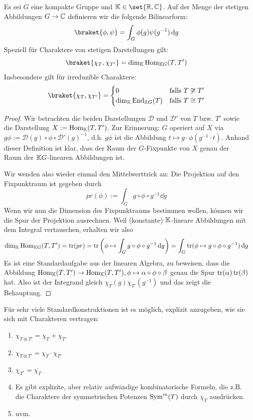\begin{theorem}[1.Orthogonalitätsrelation]
Es sei $G$ eine kompakte Gruppe und $\IK\in\set{\IR,\IC}$. Auf der Menge der stetigen Abbildungen $G\to\mathbb{C}$ definieren wir die folgende Bilinearform:
\[\braket{\phi,\psi} = \int_G \phi(g)\psi(g^{-1}) \dd g\]
Speziell für Charaktere von stetigen Darstellungen gilt:
\[\braket{\chi_T, \chi_{T'}} = \dim_\IK \Hom_{\IK G}(T,T')\]
Insbesondere gilt für irreduzible Charaktere:
\[\braket{\chi_T, \chi_{T'}} = \begin{cases} 0 & \text{falls }T\not\isomorphic T' \\ \dim_\IK \End_{\IK G}(T) & \text{falls }T\isomorphic T'\end{cases}\]
\end{theorem}
\begin{proof}
Wir betrachten die beiden Darstellungen $\mathcal{D}$ und $\mathcal{D}'$ von $T$ bzw. $T'$ sowie die Darstellung $X:=\operatorname{Hom}_{\mathbb{K}}(T,T')$. Zur Erinnerung: $G$ operiert auf $X$ via $g\phi := \mathcal{D}(g)\circ\phi\circ \mathcal{D}'(g)^{-1}$, d.h. $g\phi$ ist die Abbildung $t\mapsto g\cdot\phi(g^{-1}\cdot t)$. Anhand dieser Definition ist klar, dass der Raum der $G$-Fixpunkte von $X$ genau der Raum der $\mathbb{K} G$-linearen Abbildungen ist.

\smallbreak
Wir wenden also wieder einmal den Mittelwerttrick an: Die Projektion auf den Fixpunktraum ist gegeben durch
\[pr(\phi) := \int_G g\circ\phi\circ g^{-1} \dd g\]
Wenn wir nun die Dimension des Fixpunktraums bestimmen wollen, können wir die Spur der Projektion ausrechnen. Weil (konstante) $\mathbb{K}$-lineare Abbildungen mit dem Integral vertauschen, erhalten wir also
\[\dim_{\mathbb{K}} \operatorname{Hom}_{\mathbb{K} G}(T,T') = \operatorname{tr}(pr) = \operatorname{tr}\left(\phi \mapsto \int_G g\circ\phi\circ g^{-1} \,\textrm{d} g \right) = \int_G \operatorname{tr}(\phi \mapsto g\circ \phi\circ g^{-1}) \,\textrm{d} g\]
Es ist eine Standardaufgabe aus der linearen Algebra, zu beweisen, dass die Abbildung $\operatorname{Hom}_{\mathbb{K}}(T,T') \to \operatorname{Hom}_{\mathbb{K}}(T,T'), \phi \mapsto \alpha\circ\phi\circ\beta$ genau die Spur $\operatorname{tr}(\alpha)\operatorname{tr}(\beta)$ hat. Also ist der Integrand gleich $\chi_T(g)\chi_{T'}(g^{-1})$ und das zeigt die Behauptung.
\end{proof}

\begin{remark}
Für sehr viele Standardkonstruktionen ist es möglich, explizit anzugeben, wie sie sich mit Charakteren vertragen:
\begin{enumerate}
\item $\chi_{T\oplus T'} = \chi_T + \chi_{T'}$
\item $\chi_{T\otimes T'} = \chi_T \cdot \chi_{T'}$
\item $\chi_{T^\ast} = \overline{\chi_T}$
\item Es gibt explizite, aber relativ aufwändige kombinatorische Formeln, die z.B. die Charaktere der symmetrischen Potenzen $\operatorname{Sym}^m(T)$ durch $\chi_T$ ausdrücken.
\item uvm.
\end{enumerate}
\end{remark}

